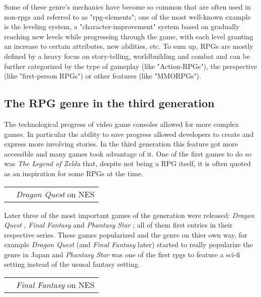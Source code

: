\documentclass[a4paper,10pt]{book}
\begin{document}
 
          Some of these genre's mechanics have become so common that are often used in non-rpgs and referred to as "rpg-elements"; one of the most well-known example is the leveling system,
          a "character-improvement" system based on gradually reaching new levels while progressing through the game, with each level granting an increase to certain attributes, new abilities, etc.
          To sum up, RPGs are mostly defined by a heavy focus on story-telling, worldbuilding and combat and can be further categorized by the type of gameplay (like "Action-RPGs"),
          the perspective (like "first-person RPGs") or other features (like "MMORPGs").
         
 
 \subsection{The RPG genre in the third generation }
 
 
          The technological progress of video game consoles allowed for more complex games. In particular the ability to save progress allowed developers to create and express more involving stories.
          In the third generation this feature got more accessible and many games took advantage of it.  
          One of the first games to do so was  \textit{The Legend of Zelda } that, despite not being a RPG itself, it is often quoted as an inspiration for some RPGs at the time.  
 
 
 \begin{longtable}{p{1mm}|l|}\hline
 
 & 
 \\\hline
 
 & \textit{Dragon Quest } on NES 
 \\\hline
 \end{longtable}
 
 
          Later three of the most important games of the generation were released:  \textit{Dragon Quest },  \textit{Final Fantasy } and  \textit{Phantasy Star }; all of them first entries in their respective series.
          These games popularized and the genre on thier own way, for example  \textit{Dragon Quest } (and  \textit{Final Fantasy } later) started to really popularize the genre in Japan
          and  \textit{Phantasy Star } was one of the first rpgs to feature a sci-fi setting instead of the ususal fantasy setting.  
 
 
 \begin{longtable}{p{1mm}|l|}\hline
 
 & 
 \\\hline
 
 & \textit{Final Fantasy } on NES 
 \\\hline
 \end{longtable}
 
\end{document}

